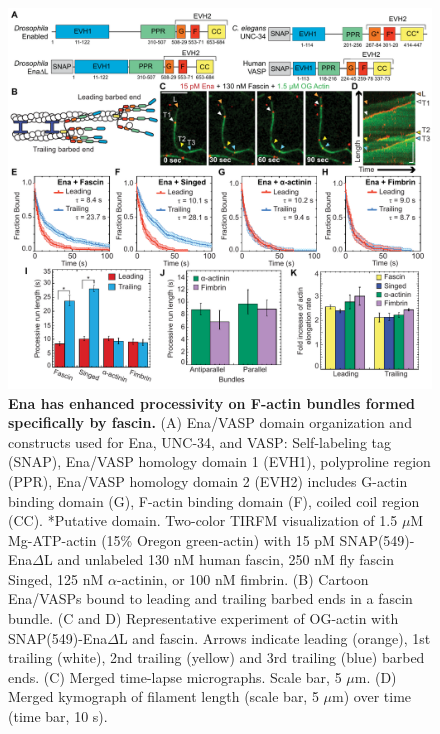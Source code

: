 \begin{figure}
\centering
\includegraphics[width=\textwidth]{img/ch02/Figure_1_elife.pdf}
\caption[Ena has enhanced processivity on F-actin bundles formed specifically by fascin.]{\textbf{Ena has enhanced processivity on F-actin bundles formed specifically by fascin.} (A) Ena/VASP domain organization and constructs used for Ena, UNC-34, and VASP: Self-labeling tag (SNAP), Ena/VASP homology domain 1 (EVH1), polyproline region (PPR), Ena/VASP homology domain 2 (EVH2) includes G-actin binding domain (G), F-actin binding domain (F), coiled coil region (CC). *Putative domain. Two-color TIRFM visualization of 1.5 $\mu$M Mg-ATP-actin (15\% Oregon green-actin) with 15 pM SNAP(549)-Ena$\Delta$L and unlabeled 130 nM human fascin, 250 nM fly fascin Singed, 125 nM $\alpha$-actinin, or 100 nM fimbrin.  (B) Cartoon Ena/VASPs bound to leading and trailing barbed ends in a fascin bundle. (C and D) Representative experiment of OG-actin with SNAP(549)-Ena$\Delta$L and fascin. Arrows indicate leading (orange), 1st trailing (white), 2nd trailing (yellow) and 3rd trailing (blue) barbed ends. (C) Merged time-lapse micrographs. Scale bar, 5 $\mu$m. (D) Merged kymograph of filament length (scale bar, 5 $\mu$m) over time (time bar, 10 s).}
\label{fig:ena-bundlers}
\end{figure}

